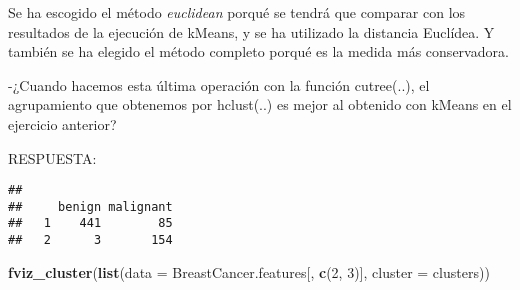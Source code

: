 \documentclass[]{article}
\newenvironment{Shaded}{\begin{snugshade}}{\end{snugshade}}
\newcommand{\CommentTok}[1]{\textcolor[rgb]{0.56,0.35,0.01}{\textit{#1}}}
\newcommand{\DataTypeTok}[1]{\textcolor[rgb]{0.13,0.29,0.53}{#1}}
\newcommand{\DecValTok}[1]{\textcolor[rgb]{0.00,0.00,0.81}{#1}}
\newcommand{\KeywordTok}[1]{\textcolor[rgb]{0.13,0.29,0.53}{\textbf{#1}}}
\newcommand{\NormalTok}[1]{#1}
\newcommand{\OperatorTok}[1]{\textcolor[rgb]{0.81,0.36,0.00}{\textbf{#1}}}
\newcommand{\StringTok}[1]{\textcolor[rgb]{0.31,0.60,0.02}{#1}}
\begin{document}
\begin{Shaded}
\end{Shaded}

Se ha escogido el método \emph{euclidean} porqué se tendrá que comparar
con los resultados de la ejecución de kMeans, y se ha utilizado la
distancia Euclídea. Y también se ha elegido el método completo porqué es
la medida más conservadora.

-¿Cuando hacemos esta última operación con la función cutree(..), el
agrupamiento que obtenemos por hclust(..) es mejor al obtenido con
kMeans en el ejercicio anterior?

RESPUESTA:

\begin{Shaded}
\end{Shaded}

\begin{verbatim}
##    
##     benign malignant
##   1    441        85
##   2      3       154
\end{verbatim}

\begin{Shaded}
\begin{Highlighting}[]
\KeywordTok{fviz_cluster}\NormalTok{(}\KeywordTok{list}\NormalTok{(}\DataTypeTok{data =}\NormalTok{ BreastCancer.features[, }\KeywordTok{c}\NormalTok{(}\DecValTok{2}\NormalTok{, }\DecValTok{3}\NormalTok{)], }\DataTypeTok{cluster =}\NormalTok{ clusters))}
\end{Highlighting}
\end{Shaded}
\end{document}
